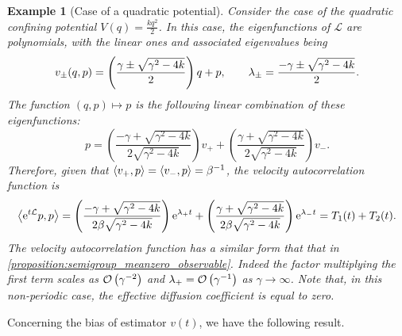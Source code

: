 \documentclass[11pt,a4paper]{article}
\newcommand{\e}{\mathrm{e}}
\renewcommand{\d}{\mathrm d}
\theoremstyle{plain}
\newtheorem{example}{Example}[section]
\numberwithin{equation}{section}
\begin{document}
\begin{example}
    [Case of a quadratic potential]
    \label{example:quadratic}
    Consider the case of the quadratic confining potential $V(q) = \frac{k q^2}{2}$.
    In this case, the eigenfunctions of $\mathcal L$ are polynomials,
    with the linear ones and associated eigenvalues being
    \[
        v_{\pm}(q, p) =
        \left( \frac{\gamma \pm \sqrt{\gamma^2 - 4k}}{2} \right) q + p, \\
        \qquad
        \lambda_{\pm} = \frac{- \gamma \pm \sqrt{\gamma^2 - 4k}}{2}.
    \]
    The function $(q, p) \mapsto p$ is the following linear combination of these eigenfunctions:
    \[
        p =
        \left( \frac{-\gamma + \sqrt{\gamma^2 - 4k}}{2 \sqrt{\gamma^2 - 4k}} \right) v_+
        + \left( \frac{\gamma + \sqrt{\gamma^2 - 4k}}{2 \sqrt{\gamma^2 - 4k}} \right) v_-.
    \]
    Therefore, given that $\ip{v_+}{p} = \ip{v_-}{p} = \beta^{-1}$,
    the velocity autocorrelation function is
    \[
        \ip{\e^{t \mathcal L}p}{p} =
        \left( \frac{-\gamma + \sqrt{\gamma^2 - 4k}}{2 \beta \sqrt{\gamma^2 - 4k}} \right) \e^{\lambda_+ t} +
        \left( \frac{\gamma + \sqrt{\gamma^2 - 4k}}{2 \beta \sqrt{\gamma^2 - 4k}} \right) \e^{\lambda_- t} = T_1(t) + T_2(t).
    \]
    The velocity autocorrelation function has a similar form that that in \cref{proposition:semigroup_meanzero_observable}.
    Indeed the factor multiplying the first term scales as $\bigo{\gamma^{-2}}$
    and $\lambda_+ = \bigo {\gamma^{-1}}$ as $\gamma \to \infty$.
    Note that, in this non-periodic case, the effective diffusion coefficient is equal to zero.
\end{example}

Concerning the bias of estimator $v(t)$,
we have the following result.
\end{document}
